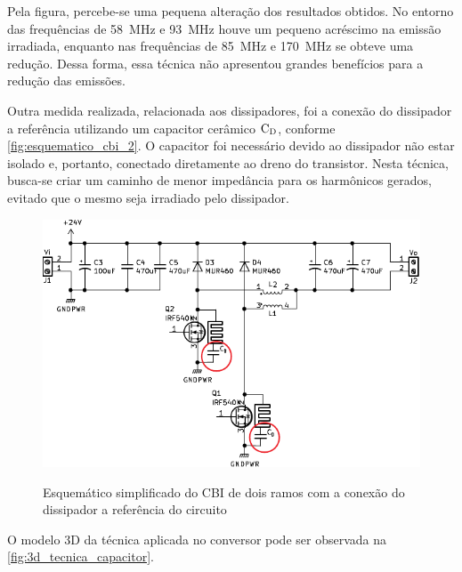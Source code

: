     Pela figura, percebe-se uma pequena alteração dos resultados obtidos. No entorno das frequências de \qty{58}{\mega\hertz} e \qty{93}{\mega\hertz} houve um pequeno acréscimo na emissão irradiada, enquanto nas frequências de \qty{85}{\mega\hertz} e \qty{170}{\mega\hertz} se obteve uma redução. Dessa forma, essa técnica não apresentou grandes benefícios para a redução das emissões. 
    
    Outra medida realizada, relacionada aos dissipadores, foi a conexão do dissipador a referência utilizando um capacitor cerâmico $\text{C}_\text{D}$, conforme \autoref{fig:esquematico_cbi_2}. O capacitor foi necessário devido ao dissipador não estar isolado e, portanto, conectado diretamente ao dreno do transistor. Nesta técnica, busca-se criar um caminho de menor impedância para os harmônicos gerados, evitado que o mesmo seja irradiado pelo dissipador. 
    
    \begin{figure}[H]
    	\centering
    	\caption{Esquemático simplificado do CBI de dois ramos com a conexão do dissipador a referência do circuito}
    	\includegraphics[scale=1.2]{pdf/layout/Esquematico_CBI_dissipador2.pdf}
        \label{fig:esquematico_cbi_2}
    \end{figure}
    
    
    O modelo 3D da técnica aplicada no conversor pode ser observada na \autoref{fig:3d_tecnica_capacitor}.
    
